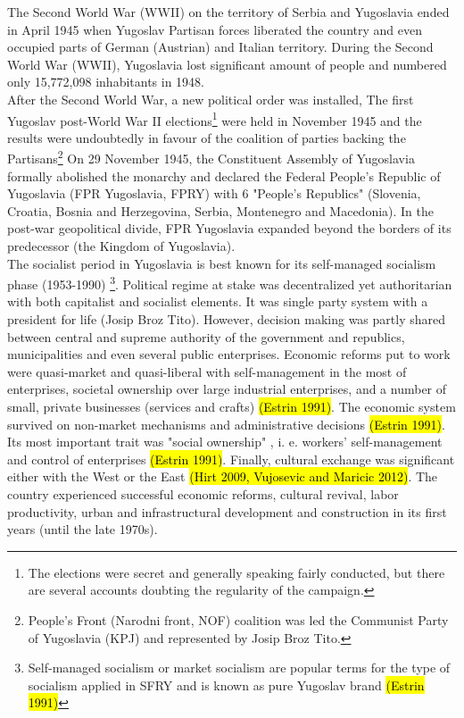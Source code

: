 \documentclass[11pt]{report}
\begin{document}
The Second World War (WWII) on the territory of Serbia and Yugoslavia ended in April 1945 when Yugoslav Partisan forces liberated the country and even occupied parts of German (Austrian) and Italian territory.
During the Second World War (WWII), Yugoslavia lost significant amount of people and numbered only 15,772,098 inhabitants in 1948.
\\
After the Second World War, a new political order was installed,
The first Yugoslav post-World War II elections\footnote{The elections were secret and generally speaking fairly conducted, but there are several accounts doubting the regularity of the campaign.} were held in November 1945 and the results were undoubtedly in favour of the coalition of parties backing the Partisans\footnote{People's Front (Narodni front, NOF) coalition was led the Communist Party of Yugoslavia (KPJ) and represented by Josip Broz Tito.}
On 29 November 1945, the Constituent Assembly of Yugoslavia formally abolished the monarchy and declared the Federal People's Republic of Yugoslavia (FPR Yugoslavia, FPRY) with 6 "People's Republics" (Slovenia, Croatia, Bosnia and Herzegovina, Serbia, Montenegro and Macedonia).
In the post-war geopolitical divide, FPR Yugoslavia expanded beyond the borders of its predecessor (the Kingdom of Yugoslavia).
\\
The socialist period in Yugoslavia is best known for its self-managed socialism phase (1953-1990) \footnote{Self-managed socialism or market socialism are popular terms for the type of socialism applied in SFRY and is known as pure Yugoslav brand \hl{(Estrin 1991)}}. Political regime at stake was decentralized yet authoritarian with both capitalist and socialist elements. It was single party system with a president for life (Josip Broz Tito).
However, decision making was partly shared between central and supreme authority of the government and republics, municipalities and even several public enterprises.
Economic reforms put to work were quasi-market and quasi-liberal with self-management in the most of enterprises, societal ownership over large industrial enterprises, and a number of small, private businesses (services and crafts) \hl{(Estrin 1991)}.
The economic system survived on non-market mechanisms and administrative decisions \hl{(Estrin 1991)}.
Its most important trait was "social  ownership" , i. e.  workers' self-management and control of  enterprises \hl{(Estrin 1991)}. Finally, cultural exchange was significant either with the West or the East \hl{(Hirt 2009, Vujosevic and Maricic 2012)}.
The country experienced successful economic reforms, cultural revival, labor productivity, urban and infrastructural development and construction in its first years (until the late 1970s).
\end{document}
